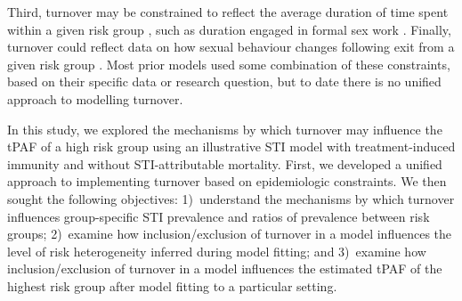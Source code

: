 Third, turnover may be constrained to reflect the average duration of time spent 
within a given risk group \citep{Boily2015},
such as duration engaged in formal sex work \citep{Watts2010}.
Finally, turnover could reflect data on how sexual behaviour changes
following exit from a given risk group \citep{Boily2015}.
Most prior models used some combination of these constraints,
based on their specific data or research question,
but to date there is no unified approach to modelling turnover.
\par
In this study, we explored the mechanisms by which turnover
may influence the tPAF of a high risk group
using an illustrative STI model
with treatment-induced immunity and without STI-attributable mortality.
First, we developed a unified approach to
implementing turnover based on epidemiologic constraints.
We then sought the following objectives:
1)~understand the mechanisms by which turnover
influences group-specific STI prevalence and ratios of prevalence between risk groups;
2)~examine how inclusion/exclusion of turnover in a model influences
the level of risk heterogeneity inferred during model fitting; and
3)~examine how inclusion/exclusion of turnover in a model influences
the estimated tPAF of the highest risk group
after model fitting to a particular setting.
